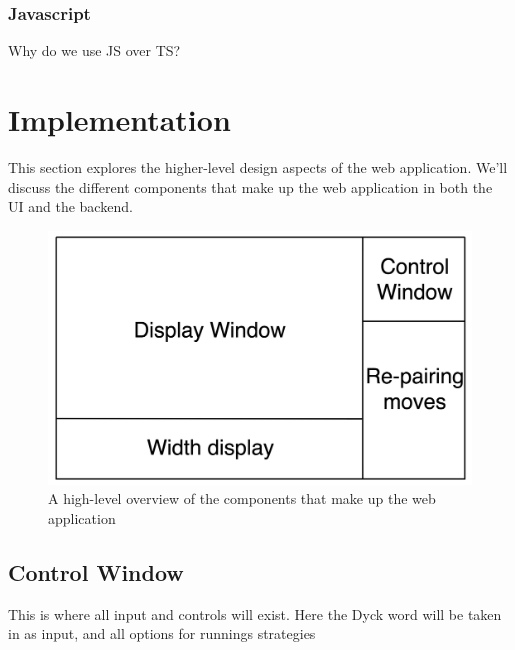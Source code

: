 \subsubsection{Javascript}
Why do we use JS over TS?

\section{Implementation}
This section explores the higher-level design aspects of the web application. We'll discuss the different components that make up the web application in both the UI and the backend.

\begin{figure}[H]
    \centering
    \includegraphics[scale=0.1]{./figures/webBreakdown.png}
    \caption{A high-level overview of the components that make up the web application}
\end{figure}

\subsection{Control Window}
This is where all input and controls will exist. Here the Dyck word will be taken in as input, and all options for runnings strategies
